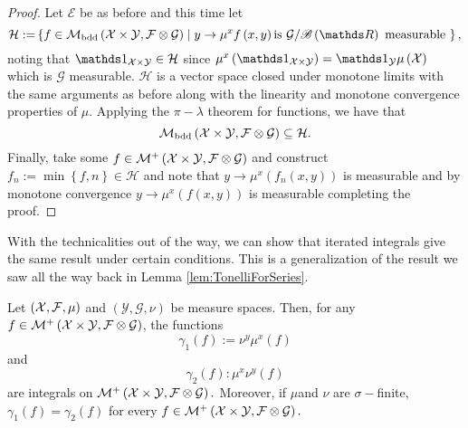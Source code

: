 \begin{proof}
Let $\mathcal{E}$ be as before and this time let
\[
\mathcal{H:=}\left\{ f\in\mathcal{M_{\text{bdd}}}\left(\X\times\mathcal{Y},\mathcal{F}\otimes\mathcal{G}\right)\mid y\to\mu^{x}f\left(x,y\right)\text{is }\mathcal{G}/\borel\left(\R\right)\text{ measurable }\right\} ,
\]
noting that $\indicate_{\X\times\mathcal{Y}}\in\mathcal{H}$ since
$\mu^{x}\left(\indicate_{\X\times\mathcal{Y}}\right)=\indicate_{\mathcal{Y}}\mu\left(\X\right)$
which is $\mathcal{G}$ measurable. $\mathcal{H}$ is a vector space
closed under monotone limits with the same arguments as before along
with the linearity and monotone convergence properties of $\mu$.
Applying the $\pi-\lambda$ theorem for functions, we have that 
\[
\mathcal{M_{\text{bdd}}}\left(\mathcal{X}\times\mathcal{Y},\mathcal{F}\otimes\mathcal{G}\right)\subseteq\mathcal{H}.
\]
Finally, take some $f\in\mathcal{M}^{+}\left(\mathcal{X}\times\mathcal{Y},\mathcal{F}\otimes\mathcal{G}\right)$
and construct $f_{n}:=\min\left\{ f,n\right\} \in\mathcal{H}$ and
note that $y\to\mu^{x}\left(f_{n}\left(x,y\right)\right)$ is measurable
and by monotone convergence $y\to\mu^{x}\left(f\left(x,y\right)\right)$
is measurable completing the proof.
\end{proof}
%
With the technicalities out of the way, we can show that iterated
integrals give the same result under certain conditions. This is a
generalization of the result we saw all the way back in Lemma \ref{lem:TonelliForSeries}.
\begin{thm}[Tonelli]
\label{thm:tonelli}Let $\left(\mathcal{X},\mathcal{F},\mu\right)$ and $\left(\mathcal{Y},\mathcal{G},\nu\right)$
be measure spaces. Then, for any $f\in\mathcal{M}^{+}\left(\mathcal{X}\times\mathcal{Y},\mathcal{F}\otimes\mathcal{G}\right)$,
the functions 
\[
\gamma_{1}\left(f\right):=\nu^{y}\mu^{x}\left(f\right)
\]
and
\[
\gamma_{2}\left(f\right):\mu^{x}\nu^{y}\left(f\right)
\]
are integrals on $\mathcal{M}^{+}\left(\mathcal{X}\times\mathcal{Y},\mathcal{F}\otimes\mathcal{G}\right).$
Moreover, if $\mu$and $\nu$ are $\sigma-$finite, $\gamma_{1}\left(f\right)=\gamma_{2}\left(f\right)$
for every $f\in\mathcal{M}^{+}\left(\mathcal{X}\times\mathcal{Y},\mathcal{F}\otimes\mathcal{G}\right).$
\end{thm}

